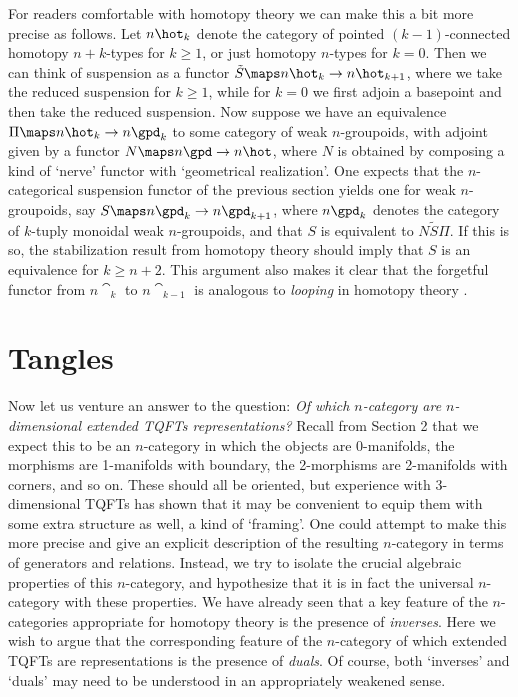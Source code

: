 For readers comfortable with homotopy theory we can make this a
bit more precise as follows.   Let $n\hot_k$ denote the category
of pointed $(k-1)$-connected homotopy $n+k$-types for $k \ge 1$,
or just homotopy $n$-types for $k = 0$.  Then we can think of
suspension as a functor $\tilde S \maps n\hot_k \to n\hot_{k+1}$,
where we take the reduced suspension for $k \ge 1$, while for $k
= 0$ we first adjoin a basepoint and then take the reduced
suspension.  Now suppose we have an equivalence $\Pi \maps
n\hot_k \to n\gpd_k$ to some category of weak
$n$-groupoids, with adjoint given by a functor $N \maps n\gpd \to
n\hot$, where $N$ is obtained by composing a
kind of `nerve' functor with `geometrical realization'.   One
expects that the $n$-categorical suspension functor of the
previous section yields one for weak $n$-groupoids, say $S \maps
n\gpd_k \to n\gpd_{k+1}$, where $n\gpd_k$ denotes the category of
$k$-tuply monoidal weak $n$-groupoids, and that $S$ is
equivalent to $N \tilde S \Pi$.  If this is so, the stabilization
result from homotopy theory should imply that $S$ is an
equivalence for $k \ge n+2$.    This argument also makes it clear
that the forgetful functor from $n\cat_k$ to $n\cat_{k-1}$ is
analogous to {\it looping} in homotopy theory \cite{KV}.

\section{Tangles}

Now let us venture an answer to the question:  {\it Of which
$n$-category are $n$-dimensional extended TQFTs representations?}
Recall from Section 2 that we expect this to be an $n$-category in
which the objects are 0-manifolds, the morphisms are 1-manifolds
with  boundary, the 2-morphisms are 2-manifolds with corners, and
so on.  These should all be oriented, but experience with
3-dimensional TQFTs has shown that it may be convenient to equip
them with some extra structure as well, a kind of `framing'.
One could attempt to make this more precise and give an explicit
description of the resulting $n$-category in terms of generators
and relations.  Instead, we try to isolate the crucial
algebraic properties of this $n$-category, and hypothesize that
it is in fact the universal $n$-category with these properties.
We have already seen that a key feature of the $n$-categories
appropriate for homotopy theory is the presence of {\it
inverses}.  Here we wish to argue that the corresponding feature
of the $n$-category of which extended TQFTs are representations
is the presence of {\it duals}.  Of course, both `inverses' and
`duals' may need to be understood in an appropriately weakened
sense.

